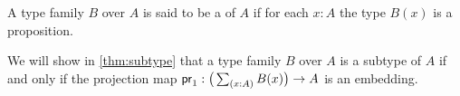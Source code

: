 \begin{defn}
A type family $B$ over $A$ is said to be a  of $A$ if for each $x:A$ the type $B(x)$ is a proposition.
\end{defn}

We will show in \cref{thm:subtype} that a type family $B$ over $A$ is a subtype of $A$ if and only if the projection map $\proj 1:\big(\sm{x:A}B(x)\big)\to A$ is an embedding.

\begin{comment}
\begin{samepage}
\begin{thm}\label{thm:subtype}
Let $B$ be a type family over $A$. The following are equivalent:
\begin{enumerate}
\item The family $B$ over $A$ is a \define{subtype} of $A$, in the sense that for each $x:A$ the type $B(x)$ is a proposition.
\item The projection map
\begin{equation*}
\proj 1 : \Big(\sm{x:A}B(x)\Big)\to A
\end{equation*}
is an embedding. 
\end{enumerate}
\end{thm}
\end{samepage}

\begin{proof}
First assume that $B(x)$ is a proposition for each $x:A$. Our goal is to show that
\begin{equation*}
\apfunc{\proj 1} : (\id{s}{t})\to (\id{\proj 1(s)}{\proj 1(t)})
\end{equation*}
is an equivalence for every $s,t:\sm{x:A}B(x)$. By $\Sigma$-induction on $s$ and \autoref{thm:id_fundamental} it suffices to show that the type
\begin{equation*}
\sm{t:\sm{x:A}B(x)} \id{a}{\proj 1(t)}
\end{equation*}
is contractible, for any $a:A$ and $b:B(a)$. 
For the center of contraction we take $\pairr{\pairr{a,b},\refl{a}}$. 
The contraction is constructed by applying $\Sigma$-induction twice, by which it suffices to construct a term of type
\begin{equation*}
\prd{x:A}{y:B(x)}{p:\id{a}{x}} \pairr{\pairr{a,b},\refl{a}}=\pairr{\pairr{x,y},p}.
\end{equation*}
This term is constructed by path induction on $p$, so it suffices to construct a term of type
\begin{equation*}
\prd{y:B(a)} \pairr{\pairr{a,b},\refl{a}}=\pairr{\pairr{a,y},\refl{a}}
\end{equation*}
However, the proposition $B(a)$ is contractible by \cref{cor:contr_prop}, since we have $b:B(a)$. Therefore we may proceed by singleton induction, so it suffices to construct an identification of type
\begin{equation*}
\pairr{\pairr{a,b},\refl{a}}=\pairr{\pairr{a,b},\refl{a}},
\end{equation*}
which we have by reflexivity. This completes the proof that if each $B(x)$ is a proposition, then the projection map $\proj 1 : \big(\sm{x:A}B(x)\big)\to A$ is an embedding.


\end{comment}
